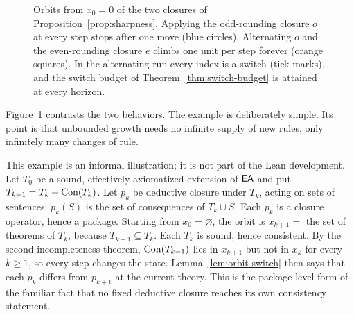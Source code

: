 \begin{figure}[t]
\centering

\caption{Orbits from $x_0=0$ of the two closures of Proposition~\ref{prop:sharpness}. Applying the odd-rounding closure $o$ at every step stops after one move (blue circles). Alternating $o$ and the even-rounding closure $e$ climbs one unit per step forever (orange squares). In the alternating run every index is a switch (tick marks), and the switch budget of Theorem~\ref{thm:switch-budget} is attained at every horizon.}
\label{fig:orbits}
\end{figure}

Figure~\ref{fig:orbits} contrasts the two behaviors. The example is deliberately simple. Its point is that unbounded growth needs no infinite supply of new rules, only infinitely many changes of rule.

\begin{example}\label{ex:consistency-progression}
This example is an informal illustration; it is not part of the Lean development. Let $T_0$ be a sound, effectively axiomatized extension of $\mathsf{EA}$ and put $T_{k+1}=T_k+\mathrm{Con}(T_k)$. Let $p_k$ be deductive closure under $T_k$, acting on sets of sentences: $p_k(S)$ is the set of consequences of $T_k\cup S$. Each $p_k$ is a closure operator, hence a package. Starting from $x_0=\varnothing$, the orbit is $x_{k+1}=$ the set of theorems of $T_k$, because $T_{k-1}\subseteq T_k$. Each $T_k$ is sound, hence consistent. By the second incompleteness theorem, $\mathrm{Con}(T_{k-1})$ lies in $x_{k+1}$ but not in $x_k$ for every $k\ge 1$, so every step changes the state. Lemma~\ref{lem:orbit-switch} then says that each $p_k$ differs from $p_{k+1}$ at the current theory. This is the package-level form of the familiar fact that no fixed deductive closure reaches its own consistency statement.
\end{example}
